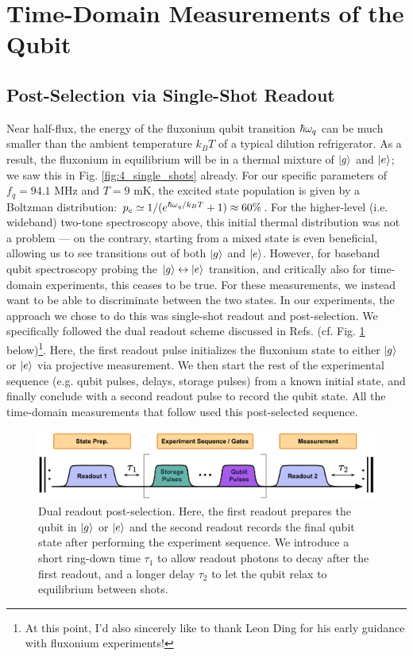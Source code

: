 \section{Time-Domain Measurements of the Qubit \label{sec:4_Time_Domain}}

\subsection{Post-Selection via Single-Shot Readout}

Near half-flux, the energy of the fluxonium qubit transition $\hbar\omega_q$ can be much smaller than the ambient temperature $k_BT$ of a typical dilution refrigerator. As a result, the fluxonium in equilibrium will be in a thermal mixture of $\lvert g\rangle$ and $\lvert e\rangle$; we saw this in Fig. \ref{fig:4_single_shots} already. For our specific parameters of $f_q = 94.1$ MHz and $T = 9$ mK, the excited state population is given by a Boltzman distribution: $p_e \simeq 1 / (e^{\hbar\omega_q/k_B T} + 1) \approx 60\%$. For the higher-level (i.e. wideband) two-tone spectroscopy above, this initial thermal distribution was not a problem --- on the contrary, starting from a mixed state is even beneficial, allowing us to see transitions out of both $\lvert g\rangle$ and $\lvert e\rangle$. However, for baseband qubit spectroscopy probing the $\lvert g\rangle\leftrightarrow\lvert e\rangle$ transition, and critically also for time-domain experiments, this ceases to be true. For these measurements, we instead want to be able to discriminate between the two states. In our experiments, the approach we chose to do this was single-shot readout and post-selection. We specifically followed the dual readout scheme discussed in Refs. \cite{ding2023FTF, ding2023thesis} (cf. Fig. \ref{fig:4_postselection} below)\footnote{At this point, I'd also sincerely like to thank Leon Ding for his early guidance with fluxonium experiments!}. Here, the first readout pulse initializes the fluxonium state to either $\lvert g\rangle$ or $\lvert e\rangle$ via projective measurement. We then start the rest of the experimental sequence (e.g. qubit pulses, delays, storage pulses) from a known initial state, and finally conclude with a second readout pulse to record the qubit state. All the time-domain measurements that follow used this post-selected sequence. 

\begin{figure}[b!]
    \centering
    \includegraphics[width=0.9\linewidth]{Figures/4/postselection.pdf}
    \caption{Dual readout post-selection. Here, the first readout prepares the qubit in $\lvert g\rangle$ or $\lvert e\rangle$ and the second readout records the final qubit state after performing the experiment sequence. We introduce a short ring-down time $\tau_1$ to allow readout photons to decay after the first readout, and a longer delay $\tau_2$ to let the qubit relax to equilibrium between shots.}
    \label{fig:4_postselection}
\end{figure}
\clearpage

